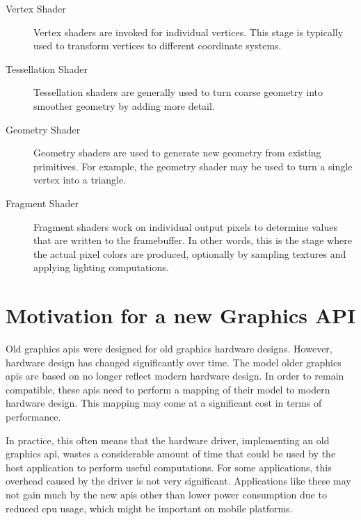     \begin{description}
      \item[Vertex Shader]
        Vertex shaders are invoked for individual vertices.
        This stage is typically used to transform vertices to different coordinate systems.

      \item[Tessellation Shader]
        Tessellation shaders are generally used to turn coarse geometry into smoother geometry by adding more detail.

      \item[Geometry Shader]
        Geometry shaders are used to generate new geometry from existing primitives.
        For example, the geometry shader may be used to turn a single vertex into a triangle.

      \item[Fragment Shader]
        Fragment shaders work on individual output pixels to determine values that are written to the framebuffer.
        In other words, this is the stage where the actual pixel colors are produced, optionally by sampling textures and applying lighting computations.
    \end{description}


  \section{Motivation for a new Graphics API}
    Old graphics \glspl{api} were designed for old graphics hardware designs.
    However, hardware design has changed significantly over time.
    The model older graphics \glspl{api} are based on no longer reflect modern hardware design.
    In order to remain compatible, these \glspl{api} need to perform a mapping of their model to modern hardware design.
    This mapping may come at a significant cost in terms of performance.

    In practice, this often means that the hardware driver, implementing an old graphics \gls{api}, wastes a considerable amount of time that could be used by the host application to perform useful computations.
    For some applications, this overhead caused by the driver is not very significant.
    Applications like these may not gain much by the new \glspl{api} other than lower power consumption due to reduced \gls{cpu} usage, which might be important on mobile platforms.

